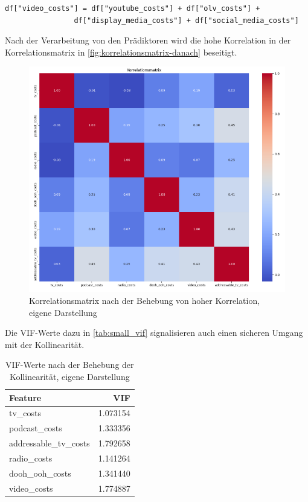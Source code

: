\begin{lstlisting}
df["video_costs"] = df["youtube_costs"] + df["olv_costs"] + 
                df["display_media_costs"] + df["social_media_costs"]
\end{lstlisting}
Nach der Verarbeitung von den Prädiktoren wird die hohe Korrelation in der Korrelationsmatrix in \autoref{fig:korrelationsmatrix-danach} beseitigt.
\begin{figure}
    \centering
    \includegraphics[width=0.75\linewidth]{images/korrelationafter.png}
    \caption{Korrelationsmatrix nach der Behebung von hoher Korrelation, eigene Darstellung}
    \label{fig:korrelationsmatrix-danach}
\end{figure}
Die \ac{VIF}-Werte dazu in \autoref{tab:small_vif} signalisieren auch einen sicheren Umgang mit der Kollinearität. 
\begin{table}[H]
    \centering
    \begin{tabular}{|l|r|}
        \hline
        \textbf{Feature} & \textbf{VIF} \\ 
        \hline
        tv\_costs            & 1.073154 \\
        podcast\_costs       & 1.333356 \\
        addressable\_tv\_costs & 1.792658 \\
        radio\_costs         & 1.141264 \\
        dooh\_ooh\_costs     & 1.341440 \\
        video\_costs         & 1.774887 \\
        \hline
    \end{tabular}
    \caption{VIF-Werte nach der Behebung der Kollinearität, eigene Darstellung}
    \label{tab:small_vif}
\end{table}
